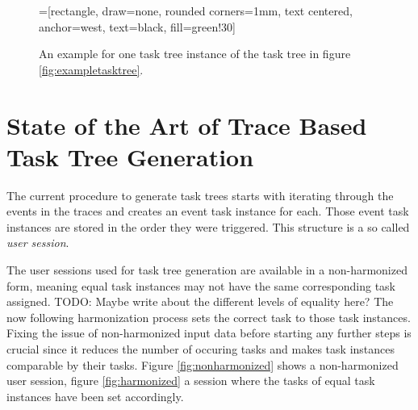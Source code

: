 	\begin{figure}
		=[rectangle, draw=none, rounded corners=1mm,
		        text centered, anchor=west, text=black, fill=green!30]

		\caption{An example for one task tree instance of the task tree in figure \ref{fig:exampletasktree}\cite{harms2013}.}
		\label{fig:exampletaskinstancetree}
	\end{figure}

\section{State of the Art of Trace Based Task Tree Generation}
The current procedure to generate task trees\cite{harms2013} starts with iterating through the events in the traces and creates an event task instance for each.
Those event task instances are stored in the order they were triggered.  This structure is a so called \textit{user session}.

The user sessions used for task tree generation are available in a non-harmonized form,
meaning equal task instances may not have the same corresponding task assigned. TODO: Maybe write about the different levels of equality here?
The now following harmonization process sets the correct task to those task instances.
Fixing the issue of non-harmonized input data before starting any further steps is crucial since it reduces the number of occuring tasks and makes task instances
comparable by their tasks. Figure \ref{fig:nonharmonized} shows a non-harmonized user session, figure \ref{fig:harmonized} a session where the tasks of equal task instances have been set accordingly.


